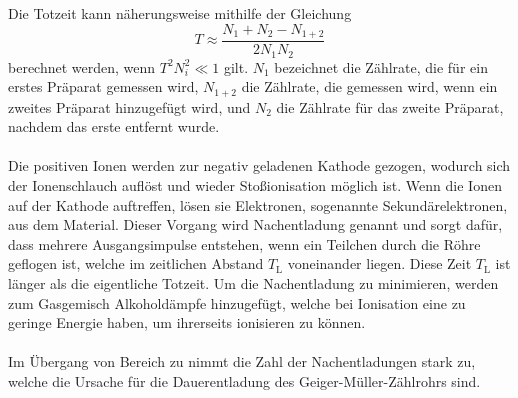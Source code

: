     Die Totzeit kann näherungsweise mithilfe der Gleichung
    \begin{equation}
      \label{eqn:totzeit}
      T \approx \frac{N_1 + N_2 - N_{1+2}}{2 N_1 N_2}
    \end{equation}
    berechnet werden, wenn $T^2 N_i ^2 \ll 1$ gilt.
    $N_1$ bezeichnet die Zählrate, die für ein erstes Präparat gemessen wird,
    $N_{1+2}$ die Zählrate, die gemessen wird, wenn ein zweites Präparat hinzugefügt wird,
    und $N_2$ die Zählrate für das zweite Präparat, nachdem das erste entfernt wurde.\\
    \\
    Die positiven Ionen werden zur negativ geladenen Kathode gezogen,
    wodurch sich der Ionenschlauch auflöst und wieder Stoßionisation möglich ist.
    Wenn die Ionen auf der Kathode auftreffen,
    lösen sie Elektronen, sogenannte Sekundärelektronen, aus dem Material.
    Dieser Vorgang wird Nachentladung genannt und sorgt dafür,
    dass mehrere Ausgangsimpulse entstehen, wenn ein Teilchen durch die Röhre geflogen ist,
    welche im zeitlichen Abstand $T_\text{L}$ voneinander liegen.
    Diese Zeit $T_\text{L}$ ist länger als die eigentliche Totzeit.
    Um die Nachentladung zu minimieren, werden zum Gasgemisch Alkoholdämpfe hinzugefügt,
    welche bei Ionisation eine zu geringe Energie haben, um ihrerseits ionisieren zu können.\\
    \\
    Im Übergang von Bereich  zu  nimmt die Zahl der Nachentladungen stark zu,
    welche die Ursache für die Dauerentladung des Geiger-Müller-Zählrohrs sind.


